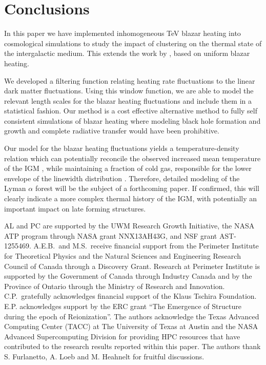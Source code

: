 \documentclass[numberedappendix]{emulateapj}
\begin{document}
\section{Conclusions}
In this paper we have implemented inhomogeneous TeV blazar heating into cosmological simulations to study the impact of clustering on the thermal state of the intergalactic medium. This extends the work by \citet{2012ApJ...752...23C,2012MNRAS.423..149P}, based on uniform blazar heating.

We developed a filtering function relating heating rate fluctuations to the linear dark matter fluctuations. Using this window function, we are able to model the relevant length scales for the blazar heating fluctuations and include them in a statistical fashion. Our method is a cost effective alternative method to fully self consistent simulations of blazar heating where modeling black hole formation and growth and complete radiative transfer would have been prohibitive.

Our model for the blazar heating fluctuations yields a temperature-density relation which can potentially reconcile the observed increased mean temperature of the IGM \citep{2014MNRAS.441.1916B}, while maintaining a fraction of cold gas, responsible for the lower envelope of the linewidth distribution \citep{2012ApJ...757L..30R}. Therefore, detailed modeling of the Lyman $\alpha$ forest will be the subject of a forthcoming paper. If confirmed, this will clearly indicate a more complex thermal history of the IGM, with potentially an important impact on late forming structures.
\begin{acknowledgements}
AL and PC are supported by the UWM Research Growth Initiative, the NASA ATP
program through NASA grant NNX13AH43G, and NSF grant AST-1255469.
A.E.B.~and M.S.~receive financial support from the Perimeter
Institute for Theoretical Physics and the Natural Sciences and
Engineering Research Council of Canada through a Discovery Grant.
Research at Perimeter Institute is supported by the Government of
Canada through Industry Canada and by the Province of Ontario through
the Ministry of Research and Innovation.
C.P.~gratefully acknowledges
financial support of the Klaus Tschira Foundation. E.P. acknowledges support by the ERC grant ``The Emergence of Structure during the epoch of Reionization''.
The authors acknowledge the Texas Advanced Computing Center (TACC) at The University of Texas at Austin and the NASA Advanced Supercomputing Division for providing HPC resources that have contributed to the research results reported within this paper. The authors thank S. Furlanetto, A. Loeb and M. Heahnelt for fruitful discussions. 
\end{acknowledgements}
\end{document}
